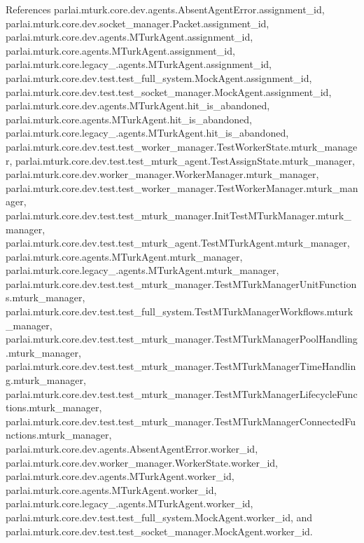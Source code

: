 References parlai.\+mturk.\+core.\+dev.\+agents.\+Absent\+Agent\+Error.\+assignment\+\_\+id, parlai.\+mturk.\+core.\+dev.\+socket\+\_\+manager.\+Packet.\+assignment\+\_\+id, parlai.\+mturk.\+core.\+dev.\+agents.\+M\+Turk\+Agent.\+assignment\+\_\+id, parlai.\+mturk.\+core.\+agents.\+M\+Turk\+Agent.\+assignment\+\_\+id, parlai.\+mturk.\+core.\+legacy\+\_.\+agents.\+M\+Turk\+Agent.\+assignment\+\_\+id, parlai.\+mturk.\+core.\+dev.\+test.\+test\+\_\+full\+\_\+system.\+Mock\+Agent.\+assignment\+\_\+id, parlai.\+mturk.\+core.\+dev.\+test.\+test\+\_\+socket\+\_\+manager.\+Mock\+Agent.\+assignment\+\_\+id, parlai.\+mturk.\+core.\+dev.\+agents.\+M\+Turk\+Agent.\+hit\+\_\+is\+\_\+abandoned, parlai.\+mturk.\+core.\+agents.\+M\+Turk\+Agent.\+hit\+\_\+is\+\_\+abandoned, parlai.\+mturk.\+core.\+legacy\+\_.\+agents.\+M\+Turk\+Agent.\+hit\+\_\+is\+\_\+abandoned, parlai.\+mturk.\+core.\+dev.\+test.\+test\+\_\+worker\+\_\+manager.\+Test\+Worker\+State.\+mturk\+\_\+manager, parlai.\+mturk.\+core.\+dev.\+test.\+test\+\_\+mturk\+\_\+agent.\+Test\+Assign\+State.\+mturk\+\_\+manager, parlai.\+mturk.\+core.\+dev.\+worker\+\_\+manager.\+Worker\+Manager.\+mturk\+\_\+manager, parlai.\+mturk.\+core.\+dev.\+test.\+test\+\_\+worker\+\_\+manager.\+Test\+Worker\+Manager.\+mturk\+\_\+manager, parlai.\+mturk.\+core.\+dev.\+test.\+test\+\_\+mturk\+\_\+manager.\+Init\+Test\+M\+Turk\+Manager.\+mturk\+\_\+manager, parlai.\+mturk.\+core.\+dev.\+test.\+test\+\_\+mturk\+\_\+agent.\+Test\+M\+Turk\+Agent.\+mturk\+\_\+manager, parlai.\+mturk.\+core.\+agents.\+M\+Turk\+Agent.\+mturk\+\_\+manager, parlai.\+mturk.\+core.\+legacy\+\_.\+agents.\+M\+Turk\+Agent.\+mturk\+\_\+manager, parlai.\+mturk.\+core.\+dev.\+test.\+test\+\_\+mturk\+\_\+manager.\+Test\+M\+Turk\+Manager\+Unit\+Functions.\+mturk\+\_\+manager, parlai.\+mturk.\+core.\+dev.\+test.\+test\+\_\+full\+\_\+system.\+Test\+M\+Turk\+Manager\+Workflows.\+mturk\+\_\+manager, parlai.\+mturk.\+core.\+dev.\+test.\+test\+\_\+mturk\+\_\+manager.\+Test\+M\+Turk\+Manager\+Pool\+Handling.\+mturk\+\_\+manager, parlai.\+mturk.\+core.\+dev.\+test.\+test\+\_\+mturk\+\_\+manager.\+Test\+M\+Turk\+Manager\+Time\+Handling.\+mturk\+\_\+manager, parlai.\+mturk.\+core.\+dev.\+test.\+test\+\_\+mturk\+\_\+manager.\+Test\+M\+Turk\+Manager\+Lifecycle\+Functions.\+mturk\+\_\+manager, parlai.\+mturk.\+core.\+dev.\+test.\+test\+\_\+mturk\+\_\+manager.\+Test\+M\+Turk\+Manager\+Connected\+Functions.\+mturk\+\_\+manager, parlai.\+mturk.\+core.\+dev.\+agents.\+Absent\+Agent\+Error.\+worker\+\_\+id, parlai.\+mturk.\+core.\+dev.\+worker\+\_\+manager.\+Worker\+State.\+worker\+\_\+id, parlai.\+mturk.\+core.\+dev.\+agents.\+M\+Turk\+Agent.\+worker\+\_\+id, parlai.\+mturk.\+core.\+agents.\+M\+Turk\+Agent.\+worker\+\_\+id, parlai.\+mturk.\+core.\+legacy\+\_.\+agents.\+M\+Turk\+Agent.\+worker\+\_\+id, parlai.\+mturk.\+core.\+dev.\+test.\+test\+\_\+full\+\_\+system.\+Mock\+Agent.\+worker\+\_\+id, and parlai.\+mturk.\+core.\+dev.\+test.\+test\+\_\+socket\+\_\+manager.\+Mock\+Agent.\+worker\+\_\+id.



